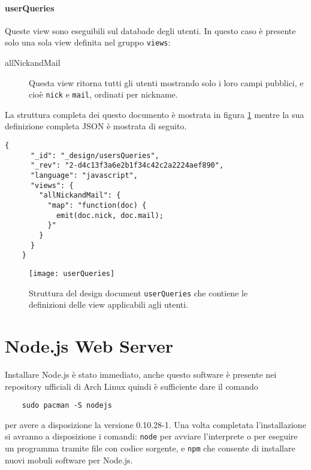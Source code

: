                 \paragraph{userQueries} Queste view sono eseguibili sul 
                databade degli utenti. In questo caso è presente solo una sola 
                view definita nel gruppo \texttt{views}:
                \begin{description}
                    \item[allNickandMail] Questa view ritorna tutti gli utenti 
                    mostrando solo i loro campi pubblici, e cioè \texttt{nick} 
                    e \texttt{mail}, ordinati per nickname.
                \end{description}
                La struttura completa dei questo documento è mostrata in 
                figura \ref{fig:userQueries} mentre la sua definizione completa 
                JSON è mostrata di seguito.
                \begin{lstlisting}[language=plane] 
    {
      "_id": "_design/usersQueries",
      "_rev": "2-d4c13f3a6e2b1f34c42c2a2224aef890",
      "language": "javascript",
      "views": {
        "allNickandMail": {
          "map": "function(doc) {
            emit(doc.nick, doc.mail);
          }"
        }
      }
    }
                \end{lstlisting}
                \begin{figure}[H]
                    \centering
                    \texttt{[image: userQueries]}
                    \caption{
                        Struttura del design document \texttt{userQueries} che 
                        contiene le definizioni delle view applicabili agli 
                        utenti.
                    }
                    \label{fig:userQueries}
                \end{figure}
    
    
    \section{Node.js Web Server}
        Installare Node.js è stato immediato, anche questo software è 
        presente nei repository ufficiali di Arch Linux quindi è sufficiente 
        dare il comando
        \begin{lstlisting}
    sudo pacman -S nodejs
        \end{lstlisting}
        per avere a disposizione la versione 0.10.28-1. Una volta completata 
        l'installazione si avranno a disposizione i comandi: \texttt{node} 
        per avviare l'interprete o per eseguire un programma tramite file con 
        codice sorgente, e \texttt{npm} che consente di installare nuovi 
        mobuli software per Node.js.
